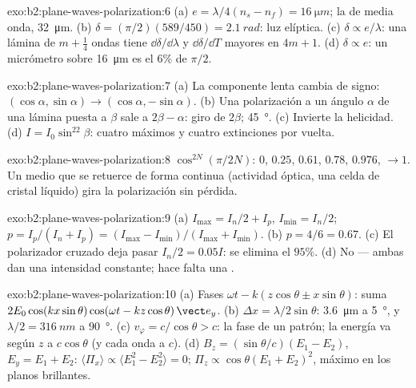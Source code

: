 \begin{solution}{exo:b2:plane-waves-polarization:6}
(a) $e = \lambda/4(n_s - n_f) = \qty{16}{\micro m}$; la de media onda, \qty{32}{\micro m}. (b) $\delta =
(\pi/2)(589/450) = \qty{2.1}{rad}$: luz elíptica. (c) $\delta \propto e/\lambda$: una
lámina de $m + \tfrac14$ ondas tiene $\dd\delta/\dd\lambda$ y $\dd\delta/\dd T$ mayores en
$4m + 1$. (d) $\delta \propto e$: un micrómetro sobre \qty{16}{\micro m} es el $6\%$ de $\pi/2$.
\end{solution}

\begin{solution}{exo:b2:plane-waves-polarization:7}
(a) La componente lenta cambia de signo: $(\cos\alpha, \sin\alpha) \to (\cos\alpha,
-\sin\alpha)$. (b) Una polarización a un ángulo $\alpha$ de una lámina puesta a $\beta$ sale
a $2\beta - \alpha$: giro de $2\beta$; \qty{45}{\degree}. (c) Invierte la
helicidad. (d) $I = I_0\sin^22\beta$: cuatro máximos y cuatro extinciones
por vuelta.
\end{solution}

\begin{solution}{exo:b2:plane-waves-polarization:8}
$\cos^{2N}(\pi/2N)$: $0$, $0.25$, $0.61$, $0.78$, $0.976$, $\to 1$. Un medio que
se retuerce de forma continua (actividad óptica, una celda de cristal
líquido) gira la polarización sin pérdida.
\end{solution}

\begin{solution}{exo:b2:plane-waves-polarization:9}
(a) $I_{\max} = I_n/2 + I_p$, $I_{\min} = I_n/2$; $p = I_p/(I_n + I_p) = (I_{\max} -
I_{\min})/(I_{\max} + I_{\min})$. (b) $p = 4/6 = 0.67$. (c) El polarizador cruzado
deja pasar $I_n/2 = 0.05I$: se elimina el $95\%$. (d) No --- ambas dan una
intensidad constante; hace falta una .
\end{solution}

\begin{solution}{exo:b2:plane-waves-polarization:10}
(a) Fases $\omega t - k(z\cos\theta \pm x\sin\theta)$: suma $2E_0\cos(kx\sin\theta)\cos(\omega t
- kz\cos\theta)\,\vect e_y$. (b) $\Delta x = \lambda/2\sin\theta$: \qty{3.6}{\micro m} a \qty{5}{\degree},
y $\lambda/2 = \qty{316}{nm}$ a \qty{90}{\degree}. (c) $v_\varphi = c/\cos\theta > c$: la fase
de un patrón; la energía va según $z$ a $c\cos\theta$ (y cada onda a $c$).
(d) $B_z = (\sin\theta/c)(E_1 - E_2)$, $E_y = E_1 + E_2$: $\langle\Pi_x\rangle \propto
\langle E_1^2 - E_2^2\rangle = 0$; $\Pi_z \propto \cos\theta(E_1 + E_2)^2$, máximo en los
planos brillantes.
\end{solution}

